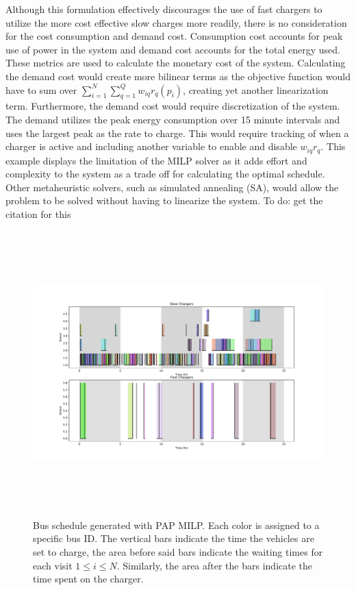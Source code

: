 \documentclass[letterpaper, 10pt, conference]{IEEEtran}
\newcommand{\TODO}[1]{{\color{green} To do: #1}}                                %
\begin{document}
Although this formulation effectively discourages the use of fast chargers to utilize the more cost effective slow charges more readily, there is no consideration for the cost consumption and demand cost. Consumption cost accounts for peak use of power in the system and demand cost accounts for the total energy used. These metrics are used to calculate the monetary cost of the system. Calculating the demand cost would create more bilinear terms as the objective function would have to sum over $\sum_{i=1}^N \sum_{q=1}^Q w_{iq}{r_q}(p_i)$, creating yet another linearization term. Furthermore, the demand cost would require discretization of the system. The demand utilizes the peak energy consumption over 15 minute intervals and uses the largest peak as the rate to charge. This would require tracking of when a charger is active and including another variable to enable and disable $w_{iq}r_q$. This example displays the limitation of the MILP solver as it adds effort and complexity to the system as a trade off for calculating the optimal schedule. Other metaheuristic solvers, such as simulated annealing (SA), would allow the problem to be solved without having to linearize the system. \TODO{get the citation for this}

\begin{figure}[ht]
	\centering
	\includegraphics[trim=1in 0.5in 1in 0.5in, width=\linewidth, height=11cm]{schedule.pdf}
	\caption{Bus schedule generated with PAP MILP. Each color is assigned to a specific bus ID. The vertical bars indicate the time the vehicles are set to charge, the area before said bars indicate the waiting times for each visit $1 \leq i \leq N$. Similarly, the area after the bars indicate the time spent on the charger.}
	\label{fig:schedule}
\end{figure}
\end{document}
